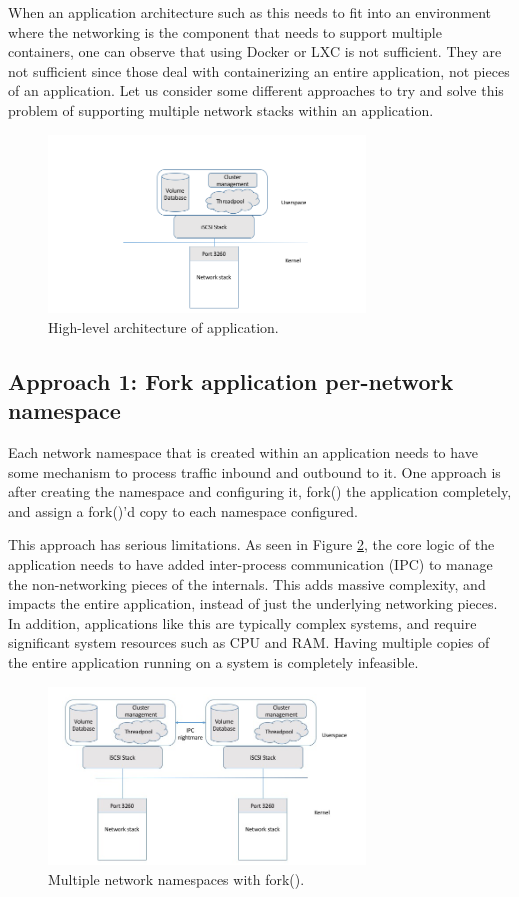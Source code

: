 \documentclass[letterpaper]{article}
\begin{document}
When an application architecture such as this needs to fit into an environment where the networking is the component that needs to support multiple containers, one can observe that using Docker or LXC is not sufficient. They are not sufficient since those deal with containerizing an entire application, not pieces of an application. Let us consider some different approaches to try and solve this problem of supporting multiple network stacks within an application.

\begin{figure}[h]
\includegraphics[width=3.31in]{standard-app-overview.png}
\caption{High-level architecture of application.}
\label{app-overview}
\end{figure}

\subsection{Approach 1: Fork application per-network namespace}
Each network namespace that is created within an application needs to have some mechanism to process traffic inbound and outbound to it. One approach is after creating the namespace and configuring it, fork() the application completely, and assign a fork()'d copy to each namespace configured.

This approach has serious limitations. As seen in Figure \ref{namespace-fork}, the core logic of the application needs to have added inter-process communication (IPC) to manage the non-networking pieces of the internals. This adds massive complexity, and impacts the entire application, instead of just the underlying networking pieces. In addition, applications like this are typically complex systems, and require significant system resources such as CPU and RAM. Having multiple copies of the entire application running on a system is completely infeasible.

\begin{figure}[h]
\includegraphics[width=3.31in]{multiple-stacks-no-namespace.png}
\caption{Multiple network namespaces with fork().}
\label{namespace-fork}
\end{figure}
\end{document}
